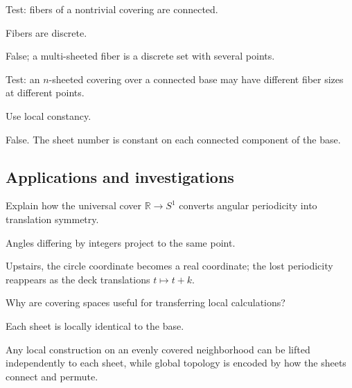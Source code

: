 \begin{exercise}\label{exr:viii10-ped-11}
Test: fibers of a nontrivial covering are connected.
\end{exercise}
\begin{hint}
Fibers are discrete.
\end{hint}
\begin{solution}
False; a multi-sheeted fiber is a discrete set with several points.
\end{solution}

\begin{exercise}\label{exr:viii10-ped-12}
Test: an $n$-sheeted covering over a connected base may have different fiber sizes at different points.
\end{exercise}
\begin{hint}
Use local constancy.
\end{hint}
\begin{solution}
False. The sheet number is constant on each connected component of the base.
\end{solution}

\subsection*{Applications and investigations}

\begin{exercise}\label{exr:viii10-ped-13}
Explain how the universal cover $\mathbb R\to S^1$ converts angular periodicity into translation symmetry.
\end{exercise}
\begin{hint}
Angles differing by integers project to the same point.
\end{hint}
\begin{solution}
Upstairs, the circle coordinate becomes a real coordinate; the lost periodicity reappears as the deck translations $t\mapsto t+k$.
\end{solution}

\begin{exercise}\label{exr:viii10-ped-14}
Why are covering spaces useful for transferring local calculations?
\end{exercise}
\begin{hint}
Each sheet is locally identical to the base.
\end{hint}
\begin{solution}
Any local construction on an evenly covered neighborhood can be lifted independently to each sheet, while global topology is encoded by how the sheets connect and permute.
\end{solution}

